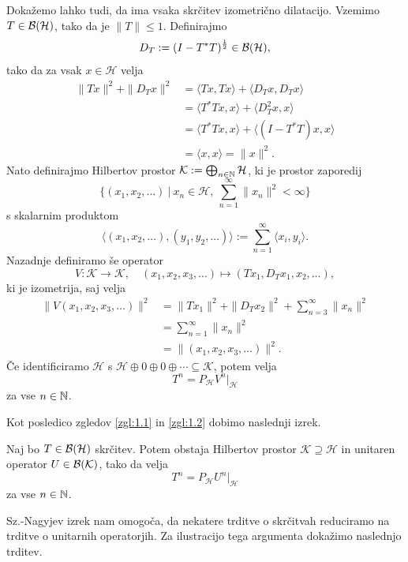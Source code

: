 \begin{zgled}\label{zgl:1.2}
    Dokažemo lahko tudi, da ima vsaka skrčitev izometrično dilatacijo.
    Vzemimo $T \in \operatorname{\mathcal{B} (\mathcal{H})}$, tako da je $\| T\| \leq 1$. Definirajmo 
    $$D_T := (I - T^* T)^{\frac{1}{2}} \in \operatorname{\mathcal{B} (\mathcal{H})},$$tako da za vsak $x \in \mathcal{H}$ velja
    \begin{align*}
        \| T x \|^2 + \| D_T x\|^2 &= \langle Tx, Tx \rangle + \langle D_T x, D_T x \rangle\\
        &= \langle T^* T x, x\rangle + \langle D_T ^2 x, x\rangle\\
        &= \langle T^* T x, x\rangle + \langle (I - T^* T) x, x\rangle\\
        &= \langle x, x \rangle = \| x\|^2.
    \end{align*}
    Nato definirajmo Hilbertov prostor $\mathcal{K} := \bigoplus_{n \in \mathbb N} \mathcal{H}$, ki je prostor zaporedij
    $$\{(x_1, x_2, \dots)\ |\ x_n \in \mathcal{H},\ \sum_{n = 1} ^\infty \| x_n\|^2 < \infty\}$$
    s skalarnim produktom
    $$\langle (x_1, x_2, \dots), (y_1, y_2, \dots) \rangle := \sum_{n = 1} ^\infty \langle x_i, y_i \rangle.$$
    Nazadnje definiramo še operator 
    $$V: \mathcal{K} \to \mathcal{K},\quad (x_1, x_2,x_3, \dots) \mapsto (T x_1, D_T x_1, x_2, \dots),$$
    ki je izometrija, saj velja
    \begin{align*}
        \| V(x_1, x_2, x_3, \dots)\|^2 &= \| T x_1\|^2 + \| D_T x_2\|^2 + \sum_{n = 3} ^\infty \| x_n\|^2 \\
        &= \sum_{n = 1} ^\infty \| x_n\|^2 \\
        &= \| (x_1, x_2, x_3, \dots )\|^2.
    \end{align*}
    Če identificiramo $\mathcal{H}$ s $\mathcal{H} \oplus 0 \oplus 0 \oplus \cdots \subseteq \mathcal{K}$, potem velja 
    $$T^n = P_{\mathcal{H}} V^n \big|_{\mathcal{H}}$$
    za vse $n \in \mathbb N$.
\end{zgled}

Kot posledico zgledov \ref{zgl:1.1} in \ref{zgl:1.2} dobimo naslednji izrek.

\begin{izrek}[Sz.-Nagy]
    Naj bo $T \in \operatorname{\mathcal{B} (\mathcal{H})}$ skrčitev. Potem obstaja Hilbertov prostor $\mathcal{K} \supseteq \mathcal{H}$ 
    in unitaren operator $U \in \operatorname{\mathcal{B} (\mathcal{K})}$, tako da velja
    $$T^n = P_{\mathcal{H}} U^n \big|_{\mathcal{H}}$$
    za vse $n \in \mathbb N$.
\end{izrek}

Sz.-Nagyjev izrek nam omogoča, da nekatere trditve o skrčitvah reduciramo na trditve o unitarnih operatorjih.
Za ilustracijo tega argumenta dokažimo naslednjo trditev.

